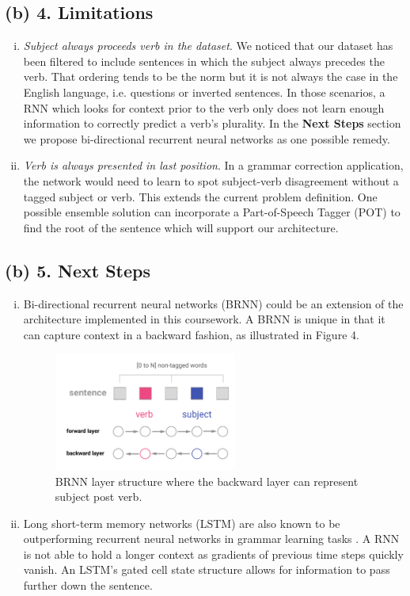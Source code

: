 \documentclass{article}
\begin{document}
\subsection*{(b) 4. Limitations}
\begin{enumerate}[(i)]
\item \textit{Subject always proceeds verb in the dataset}. We noticed that our dataset has been filtered to include sentences in which the subject always precedes the verb. That ordering tends to be the norm but it is not always the case in the English language, i.e. questions or inverted sentences. In those scenarios, a RNN which looks for context prior to the verb only does not learn enough information to correctly predict a verb's plurality. In the \textbf{Next Steps} section we propose bi-directional recurrent neural networks as one possible remedy.
\item \textit{Verb is always presented in last position}. In a grammar correction application, the network would need to learn to spot subject-verb disagreement without a tagged subject or verb. This extends the current problem definition. One possible ensemble solution can incorporate a Part-of-Speech Tagger (POT) to find the root of the sentence which will support our architecture.
\end{enumerate}
\subsection*{(b) 5. Next Steps}
\begin{enumerate}[(i)]
\item Bi-directional recurrent neural networks (BRNN) could be an extension of the architecture implemented in this coursework. A BRNN is unique in that it can capture context in a backward fashion, as illustrated in Figure 4.    

\begin{figure}[h]
\centering
\includegraphics[width=6cm]{figures/birnn.pdf} 
\caption{BRNN layer structure where the backward layer can represent subject post verb.}
\end{figure}

\item Long short-term memory networks (LSTM) are also known to be outperforming recurrent neural networks in grammar learning tasks \citep{Linzen:2016ud}. A RNN is not able to hold a longer context as gradients of previous time steps quickly vanish. An LSTM's gated cell state structure allows for information to pass further down the sentence. 
\end{enumerate}

\newpage



\newpage
\appendix
\end{document}
